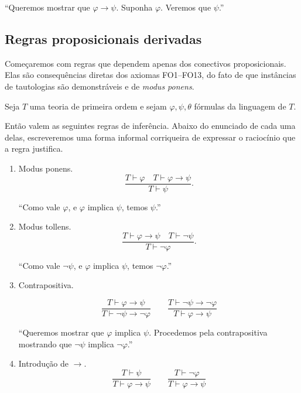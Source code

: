 ``Queremos mostrar que $\varphi\rightarrow \psi$.
Suponha $\varphi$.
Veremos que $\psi$.''

\subsection{Regras proposicionais derivadas}

Começaremos com regras que dependem apenas dos conectivos proposicionais.
Elas são consequências diretas dos axiomas FO1--FO13, do fato de que instâncias de tautologias são demonstráveis e de \emph{modus ponens}.

\begin{metaproposition}\label{mprop:regrasProposicionaisImplicacao}
    Seja $T$ uma teoria de primeira ordem e sejam $\varphi,\psi,\theta$ fórmulas da linguagem de $T$.

    Então valem as seguintes regras de inferência.
    Abaixo do enunciado de cada uma delas, escreveremos uma forma informal corriqueira de expressar o raciocínio que a regra justifica.

    \begin{enumerate}[label=(\roman*)]
        \item Modus ponens.
        \[
            \frac{T\vdash \varphi \quad T\vdash \varphi\rightarrow\psi}
                 {T\vdash \psi}.
        \]
        
        ``Como vale $\varphi$, e $\varphi$ implica $\psi$, temos $\psi$.''

        \item Modus tollens.
        \[
            \frac{T\vdash \varphi\rightarrow\psi \quad T\vdash \neg\psi}
                 {T\vdash \neg\varphi}.
        \]

        ``Como vale $\neg\psi$, e $\varphi$ implica $\psi$, temos $\neg\varphi$.''

        \item Contrapositiva.
        
        \[
            \frac{T\vdash \varphi\rightarrow\psi}
                 {T\vdash \neg\psi\rightarrow\neg\varphi} \qquad \frac{T\vdash \neg\psi\rightarrow\neg\varphi}
                 {T\vdash \varphi\rightarrow\psi}
        \]

        ``Queremos mostrar que $\varphi$ implica $\psi$.
        Procedemos pela contrapositiva mostrando que $\neg\psi$ implica $\neg\varphi$.''

        \item Introdução de $\rightarrow$.
        \[
            \frac{T\vdash \psi}
                 {T\vdash \varphi\rightarrow\psi} \qquad \frac{T\vdash \neg\varphi}
                 {T\vdash \varphi\rightarrow\psi}
        \]


\end{enumerate}
\end{metaproposition}

